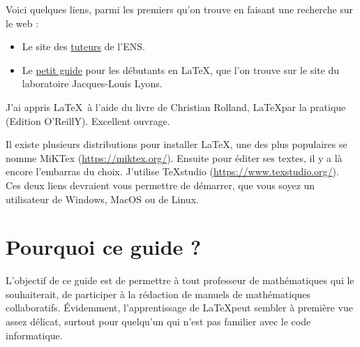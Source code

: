 Voici quelques liens, parmi les premiers qu'on trouve en faisant une recherche sur le web :

\begin{itemize}
\item Le site des \href{http://www.tuteurs.ens.fr/logiciels/latex/}{tuteurs} de l'ENS. 

\item Le \href{https://www.ljll.math.upmc.fr/privat/documents/manuelLatex.pdf}{petit guide} pour les débutants en \LaTeX, que l'on trouve sur le site du laboratoire Jacques-Louis Lyons.
\end{itemize} 

J'ai appris \LaTeX~à l'aide du livre de Christian Rolland, \LaTeX par la pratique (Edition O'ReillY). Excellent ouvrage.

Il existe plusieurs distributions pour installer \LaTeX, une des plus populaires se nomme MiKTex (\url{https://miktex.org/}). Ensuite pour éditer ses textes, il y a là encore l'embarras du choix. J'utilise TeXstudio (\url{https://www.texstudio.org/}). Ces deux liens devraient vous permettre de démarrer, que vous soyez un utilisateur de Windows, MacOS ou de Linux.

\section{Pourquoi ce guide ?}

L'objectif de ce guide est de permettre à tout professeur de mathématiques qui le souhaiterait, de participer à la rédaction de manuels de mathématiques collaboratifs. Évidemment, l'apprentissage de \LaTeX peut sembler à première vue assez délicat, surtout pour quelqu'un qui n'est pas familier avec le code informatique.  




